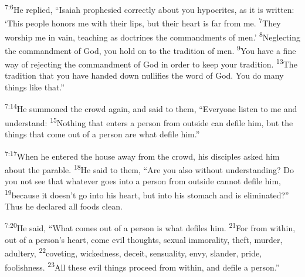 \documentclass[openany,12pt,english]{book}
\newenvironment{para}{\par\pretolerance=100\tolerance=200\setlength{\emergencystretch}{0.6em}\relax}{\par}
\begin{document}
\begin{para}
    \textsuperscript{7:6}\thinspace{}He replied, “Isaiah prophesied cor\-rect\-ly a\-bout you hypocrites, as it is writ\-ten: ‘This peo\-ple hon\-ors me with their lips, but their heart is far from me.
    \textsuperscript{7}\thinspace{}They wor\-ship me in vain, teach\-ing as doctrines the commandments of men.’
    \textsuperscript{8}\thinspace{}Neglecting the com\-mand\-ment of God, you hold on to the tra\-di\-tion of men.
    \textsuperscript{9}\thinspace{}You have a fi\-ne way of rejecting the com\-mand\-ment of God in or\-der to keep your tra\-di\-tion.
    \textsuperscript{13}\thinspace{}The tra\-di\-tion that you have hand\-ed down nullifies the word of God. You do man\-y things like that.”
\end{para}

\begin{para}
    \textsuperscript{7:14}\thinspace{}He summoned the crowd a\-gain, and said to them, “Eve\-ry\-one lis\-ten to me and un\-der\-stand:
    \textsuperscript{15}\thinspace{}Noth\-ing that enters a per\-son from out\-side can de\-file him, but the things that come out of a per\-son are what de\-file him.”
\end{para}

\begin{para}
    \textsuperscript{7:17}\thinspace{}When he entered the house a\-way from the crowd, his disciples asked him a\-bout the par\-a\-ble.
    \textsuperscript{18}\thinspace{}He said to them, “Are you al\-so with\-out un\-der\-stand\-ing? Do you not see that what\-ev\-er goes in\-to a per\-son from out\-side can\-not de\-file him,
    \textsuperscript{19}\thinspace{}be\-cause it does\-n't go in\-to his heart, but in\-to his stom\-ach and is e\-lim\-i\-nat\-ed?” Thus he de\-clared all foods clean.
\end{para}

\begin{para}
    \textsuperscript{7:20}\thinspace{}He said, “What co\-mes out of a per\-son is what defiles him.
    \textsuperscript{21}\thinspace{}For from with\-in, out of a person's heart, come evil thoughts, sex\-u\-al im\-mo\-ral\-i\-ty, theft, mur\-der, a\-dul\-ter\-y,
    \textsuperscript{22}\thinspace{}coveting, wick\-ed\-ness, de\-ceit, sen\-su\-al\-i\-ty, en\-vy, slan\-der, pride, fool\-ish\-ness.
    \textsuperscript{23}\thinspace{}All these evil things pro\-ceed from with\-in, and de\-file a per\-son.”
\end{para}

\bigskip{}
\end{document}

